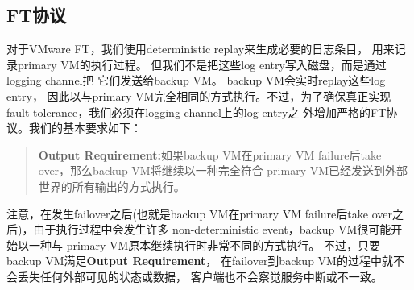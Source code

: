 \subsection{FT协议}

\insertfiguretwo

对于VMware FT，我们使用deterministic replay来生成必要的日志条目，%
用来记录primary VM的执行过程。%
但我们不是把这些log entry写入磁盘，而是通过logging channel把%
它们发送给backup VM。%
backup VM会实时replay这些log entry，%
因此以与primary VM完全相同的方式执行。不过，为了确保真正实现fault %
tolerance，我们必须在logging channel上的log entry之%
外增加严格的FT协议。我们的基本要求如下：%

\begin{quote}
\noindent\textbf{Output Requirement:}如果backup VM在primary VM %
failure后take over，那么backup VM将继续以一种完全符合%
primary VM已经发送到外部世界的所有输出的方式执行。%
\end{quote}

\noindent{}注意，在发生failover之后(也就是backup VM在primary VM %
failure后take over之后)，由于执行过程中会发生许多%
non-deterministic event，backup VM很可能开始以一种与%
primary VM原本继续执行时非常不同的方式执行。%
不过，只要backup VM满足\textbf{Output Requirement}，%
在failover到backup VM的过程中就不会丢失任何外部可见的状态或数据，%
客户端也不会察觉服务中断或不一致。%


